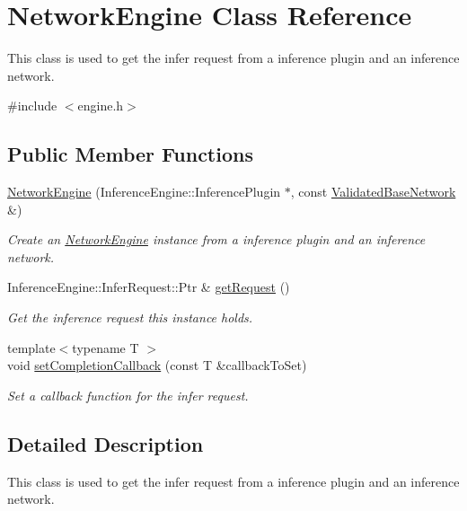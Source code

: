 \hypertarget{classNetworkEngine}{}\section{Network\+Engine Class Reference}
\label{classNetworkEngine}


This class is used to get the infer request from a inference plugin and an inference network.  




{\ttfamily \#include $<$engine.\+h$>$}

\subsection*{Public Member Functions}
\begin{DoxyCompactItemize}
\item 
\hyperlink{classNetworkEngine_a7529534aa07732f4efe7ec7f68dd9c01}{Network\+Engine} (Inference\+Engine\+::\+Inference\+Plugin $\ast$, const \hyperlink{classValidatedBaseNetwork}{Validated\+Base\+Network} \&)
\begin{DoxyCompactList}\small\item\em Create an \hyperlink{classNetworkEngine}{Network\+Engine} instance from a inference plugin and an inference network. \end{DoxyCompactList}\item 
Inference\+Engine\+::\+Infer\+Request\+::\+Ptr \& \hyperlink{classNetworkEngine_af5f24575f4110047bb7566e8b8f76006}{get\+Request} ()
\begin{DoxyCompactList}\small\item\em Get the inference request this instance holds. \end{DoxyCompactList}\item 
{\footnotesize template$<$typename T $>$ }\\void \hyperlink{classNetworkEngine_a76660bfd6bee75bd2e83a28751e00f2c}{set\+Completion\+Callback} (const T \&callback\+To\+Set)
\begin{DoxyCompactList}\small\item\em Set a callback function for the infer request. \end{DoxyCompactList}\end{DoxyCompactItemize}


\subsection{Detailed Description}
This class is used to get the infer request from a inference plugin and an inference network. 

